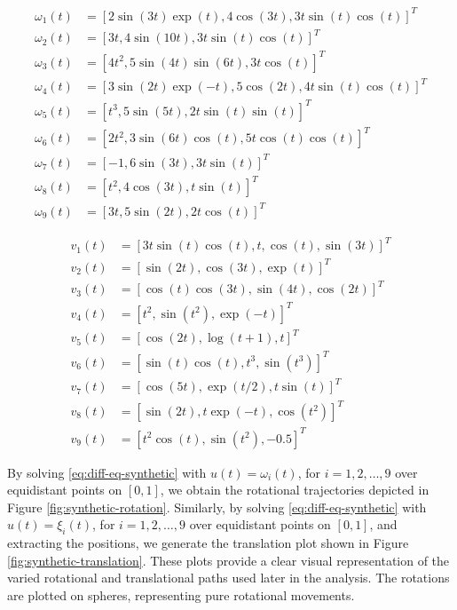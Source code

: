 \begin{equation}
    \begin{aligned}
        \omega_1(t) &= 
            [2 \sin(3t) \exp(t), 4 \cos(3t), 3t \sin(t) \cos(t)]^T \\
        \omega_2(t) &= 
            [3t, 4 \sin(10t), 3t \sin(t) \cos(t)]^T \\
        \omega_3(t) &= 
            [4t^2, 5 \sin(4t) \sin(6t), 3t \cos(t)]^T \\
        \omega_4(t) &= 
            [3 \sin(2t) \exp(-t), 5 \cos(2t), 4t \sin(t) \cos(t)]^T \\
        \omega_5(t) &= 
            [t^3, 5 \sin(5t), 2t \sin(t) \sin(t)]^T \\
        \omega_6(t) &= 
            [2t^2, 3 \sin(6t) \cos(t), 5t \cos(t) \cos(t)]^T \\
        \omega_7(t) &= 
            [-1, 6 \sin(3t), 3t \sin(t)]^T \\
        \omega_8(t) &= 
            [t^2, 4 \cos(3t), t \sin(t)]^T \\
        \omega_9(t) &= 
            [3t, 5 \sin(2t), 2t \cos(t)]^T
    \end{aligned}
    \label{eq:synthetic-data-rotation}
\end{equation}

\begin{equation}
    \begin{aligned}
        v_1(t) &= 
        [3t \sin(t) \cos(t), t, \cos(t), \sin(3t)]^T \\
        v_2(t) &=
        [\sin(2t), \cos(3t), \exp(t)]^T \\
        v_3(t) &=
        [\cos(t) \cos(3t), \sin(4t), \cos(2t)]^T \\
        v_4(t) &=
        [t^2, \sin(t^2), \exp(-t)]^T \\
        v_5(t) &=
        [\cos(2t), \log(t + 1), t]^T \\
        v_6(t) &=
        [\sin(t) \cos(t), t^3, \sin(t^3)]^T \\
        v_7(t) &=
        [\cos(5t), \exp(t/2), t \sin(t)]^T \\
        v_8(t) &=
        [\sin(2t), t \exp(-t), \cos(t^2)]^T \\
        v_9(t) &=
        [t^2 \cos(t), \sin(t^2), -0.5]^T
    \end{aligned}
    \label{eq:synthetic-data-translation}
\end{equation}

By solving \eqref{eq:diff-eq-synthetic} with \(u(t) = \omega_i(t)\), for \(i = 1, 2, \dots, 9\) over equidistant points on \([0,1]\), we obtain the rotational trajectories depicted in Figure \ref{fig:synthetic-rotation}. Similarly, by solving \eqref{eq:diff-eq-synthetic} with \(u(t) = \xi_i(t)\), for \(i = 1, 2, \dots, 9\) over equidistant points on \([0,1]\), and extracting the positions, we generate the translation plot shown in Figure \ref{fig:synthetic-translation}. These plots provide a clear visual representation of the varied rotational and translational paths used later in the analysis. The rotations are plotted on spheres, representing pure rotational movements.

